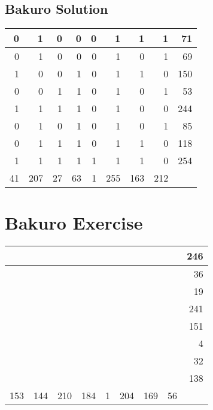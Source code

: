 \documentclass[]{article}
\begin{document}
 \subsection{Bakuro Solution} 
\begin{tabular}{rrrrrrrrr}
\hline
  0 &   1 &  0 &  0 & 0 &   1 &   1 &   1 &  71 \\ \hline
  0 &   1 &  0 &  0 & 0 &   1 &   0 &   1 &  69 \\ \hline
  1 &   0 &  0 &  1 & 0 &   1 &   1 &   0 & 150 \\ \hline
  0 &   0 &  1 &  1 & 0 &   1 &   0 &   1 &  53 \\ \hline
  1 &   1 &  1 &  1 & 0 &   1 &   0 &   0 & 244 \\ \hline
  0 &   1 &  0 &  1 & 0 &   1 &   0 &   1 &  85 \\ \hline
  0 &   1 &  1 &  1 & 0 &   1 &   1 &   0 & 118 \\ \hline
  1 &   1 &  1 &  1 & 1 &   1 &   1 &   0 & 254 \\ \hline
 41 & 207 & 27 & 63 & 1 & 255 & 163 & 212 &     \\ \hline
\hline
\end{tabular}\newpage\section{Bakuro Exercise}\begin{tabular}{rrrrrrrrr}
\hline
     &     &     &     &   &     &     &    & 246 \\ \hline
     &     &     &     &   &     &     &    &  36 \\ \hline
     &     &     &     &   &     &     &    &  19 \\ \hline
     &     &     &     &   &     &     &    & 241 \\ \hline
     &     &     &     &   &     &     &    & 151 \\ \hline
     &     &     &     &   &     &     &    &   4 \\ \hline
     &     &     &     &   &     &     &    &  32 \\ \hline
     &     &     &     &   &     &     &    & 138 \\ \hline
 153 & 144 & 210 & 184 & 1 & 204 & 169 & 56 &     \\ \hline
\hline
\end{tabular}\newpage 
\end{document}
